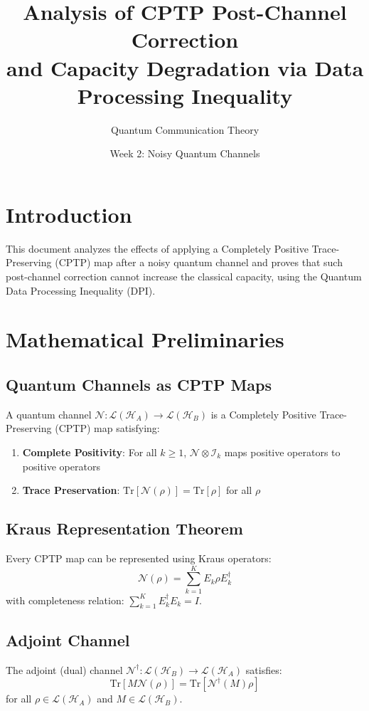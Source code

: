 \documentclass[12pt]{article}
\title{Analysis of CPTP Post-Channel Correction \\ and Capacity Degradation via Data Processing Inequality}
\author{Quantum Communication Theory}
\date{Week 2: Noisy Quantum Channels}
\begin{document}
\maketitle

\section{Introduction}
This document analyzes the effects of applying a Completely Positive Trace-Preserving (CPTP) map after a noisy quantum channel and proves that such post-channel correction cannot increase the classical capacity, using the Quantum Data Processing Inequality (DPI).

\section{Mathematical Preliminaries}

\subsection{Quantum Channels as CPTP Maps}
A quantum channel $\mathcal{N}: \mathcal{L}(\mathcal{H}_A) \to \mathcal{L}(\mathcal{H}_B)$ is a Completely Positive Trace-Preserving (CPTP) map satisfying:

\begin{enumerate}
    \item \textbf{Complete Positivity}: For all $k \geq 1$, $\mathcal{N} \otimes \mathcal{I}_k$ maps positive operators to positive operators
    \item \textbf{Trace Preservation}: $\text{Tr}[\mathcal{N}(\rho)] = \text{Tr}[\rho]$ for all $\rho$
\end{enumerate}

\subsection{Kraus Representation Theorem}
Every CPTP map can be represented using Kraus operators:
\[
\mathcal{N}(\rho) = \sum_{k=1}^K E_k \rho E_k^\dagger
\]
with completeness relation: $\sum_{k=1}^K E_k^\dagger E_k = I$.

\subsection{Adjoint Channel}
The adjoint (dual) channel $\mathcal{N}^\dagger: \mathcal{L}(\mathcal{H}_B) \to \mathcal{L}(\mathcal{H}_A)$ satisfies:
\[
\text{Tr}[M \mathcal{N}(\rho)] = \text{Tr}[\mathcal{N}^\dagger(M) \rho]
\]
for all $\rho \in \mathcal{L}(\mathcal{H}_A)$ and $M \in \mathcal{L}(\mathcal{H}_B)$.
\end{document}
